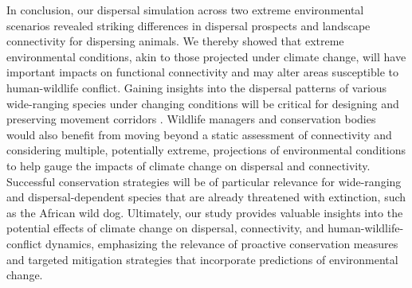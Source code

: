 \documentclass[../FinalThesis.tex]{subfiles}
\begin{document}

In conclusion, our dispersal simulation across two extreme environmental
scenarios revealed striking differences in dispersal prospects and landscape
connectivity for dispersing animals. We thereby showed that extreme
environmental conditions, akin to those projected under climate change, will
have important impacts on functional connectivity and may alter areas
susceptible to human-wildlife conflict. Gaining insights into the dispersal
patterns of various wide-ranging species under changing conditions will be
critical for designing and preserving movement corridors \citep{Vasudev.2015}.
Wildlife managers and conservation bodies would also benefit from moving beyond
a static assessment of connectivity and considering multiple, potentially
extreme, projections of environmental conditions to help gauge the impacts of
climate change on dispersal and connectivity. Successful conservation strategies
will be of particular relevance for wide-ranging and dispersal-dependent species
that are already threatened with extinction, such as the African wild dog.
Ultimately, our study provides valuable insights into the potential effects of
climate change on dispersal, connectivity, and human-wildlife-conflict dynamics,
emphasizing the relevance of proactive conservation measures and targeted
mitigation strategies that incorporate predictions of environmental change.

%
%

\end{document}
